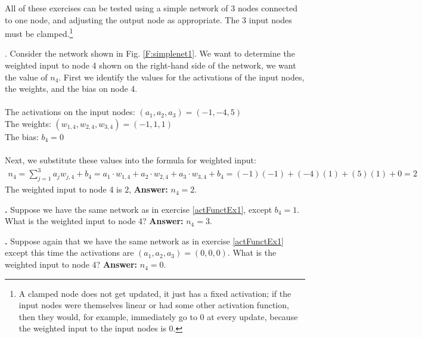    All of these exercises can be tested using a simple network of 3 nodes connected to one node, and 
adjusting the output node as appropriate. The 3 input nodes must be clamped.\footnote{A clamped node does not get updated, it just has a fixed activation; if the input nodes were themselves linear or had some other activation function, then they would, for example, immediately go to 0 at every update, because the weighted input to the input nodes is 0.}
\bigskip


\label{actFunctEx1}
\noindent
{\bf \theActFunctionCounter}. Consider the network shown in Fig. \ref{F:simplenet1}. We want to determine the weighted 
input to node 4 shown on the right-hand side of the network, \ie we want the
value of $n_4$. First we identify the values for the activations of the input 
nodes, the weights, and the bias on node 4. \\ \\
\indent \qquad\qquad The activations on the input nodes: $(a_1,a_2,a_3) = 
(-1,-4,5)$ \\
\indent \qquad\qquad The weights: $(w_{1,4}, w_{2,4}, w_{3,4}) = (-1,1,1)$ \\
\indent \qquad\qquad The bias: $b_4 = 0$ \\ \\
Next, we substitute these values into the formula for weighted input:
\begin{eqnarray*}
n_4 = \sum_{j=1}^{3}  a_j  w_{j,4} + b_4 
    =  a_1 \cdot w_{1,4} + a_2 \cdot w_{2,4} + a_3 \cdot w_{3,4} + b_4 
    =      (-1)(-1)      +      (-4)(1)      +       (5)(1)      + 0 
    = 2
\end{eqnarray*}
The weighted input to node 4 is $2$, {\bf Answer:} $n_4=2$.

\bigskip

\noindent

{\bf \theActFunctionCounter.} Suppose we have the same network as in exercise \ref{actFunctEx1}, except 
$b_4 = 1$. What is the weighted input to node 4? {\bf Answer:} $n_4=3$.

\bigskip

\noindent
{\bf \theActFunctionCounter.} Suppose again that we have the same network as in exercise \ref{actFunctEx1} except this time the activations are $(a_1,a_2,a_3) = (0,0,0)$. What is the 
weighted input to node 4? {\bf Answer:} $n_4=0$.

